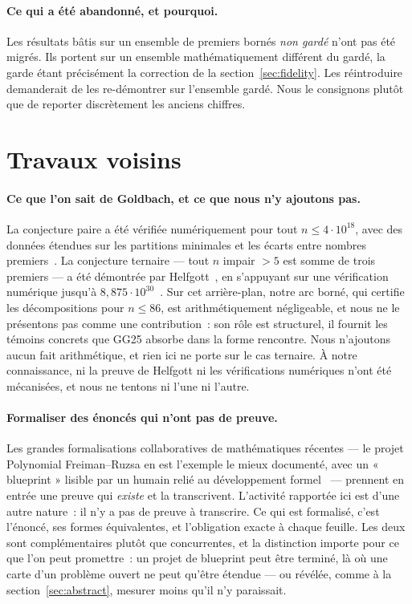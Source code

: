 \documentclass[11pt]{article}
\theoremstyle{remark}\newtheorem{remarque}{Remarque}
\begin{document}
\paragraph{Ce qui a été abandonné, et pourquoi.} Les résultats bâtis sur un ensemble de
premiers bornés \emph{non gardé} n'ont pas été migrés. Ils portent sur un ensemble
mathématiquement différent du gardé, la garde étant précisément la correction de la
section~\ref{sec:fidelity}. Les réintroduire demanderait de les re-démontrer sur
l'ensemble gardé. Nous le consignons plutôt que de reporter discrètement les anciens
chiffres.

\section{Travaux voisins}
\label{sec:related}

\paragraph{Ce que l'on sait de Goldbach, et ce que nous n'y ajoutons pas.} La conjecture
paire a été vérifiée numériquement pour tout $n \le 4 \cdot 10^{18}$, avec des données
étendues sur les partitions minimales et les écarts entre nombres
premiers~\cite{oesilva2014goldbach}. La conjecture ternaire --- tout $n$ impair $> 5$ est
somme de trois premiers --- a été démontrée par Helfgott~\cite{helfgott2013ternary}, en
s'appuyant sur une vérification numérique jusqu'à
$8{,}875 \cdot 10^{30}$~\cite{helfgott2013numerical}. Sur cet arrière-plan, notre arc
borné, qui certifie les décompositions pour $n \le 86$, est arithmétiquement négligeable,
et nous ne le présentons pas comme une contribution~: son rôle est structurel, il fournit
les témoins concrets que GG25 absorbe dans la forme rencontre. Nous n'ajoutons aucun fait
arithmétique, et rien ici ne porte sur le cas ternaire. À notre connaissance, ni la
preuve de Helfgott ni les vérifications numériques n'ont été mécanisées, et nous ne
tentons ni l'une ni l'autre.

\paragraph{Formaliser des énoncés qui n'ont pas de preuve.} Les grandes formalisations
collaboratives de mathématiques récentes --- le projet Polynomial Freiman--Ruzsa en est
l'exemple le mieux documenté, avec un « blueprint » lisible par un humain relié au
développement formel~\cite{tao2023pfr} --- prennent en entrée une preuve qui \emph{existe}
et la transcrivent. L'activité rapportée ici est d'une autre nature~: il n'y a pas de
preuve à transcrire. Ce qui est formalisé, c'est l'énoncé, ses formes équivalentes, et
l'obligation exacte à chaque feuille. Les deux sont complémentaires plutôt que
concurrentes, et la distinction importe pour ce que l'on peut promettre~: un projet de
blueprint peut être terminé, là où une carte d'un problème ouvert ne peut qu'être
étendue --- ou révélée, comme à la section~\ref{sec:abstract}, mesurer moins qu'il n'y
paraissait.
\end{document}
